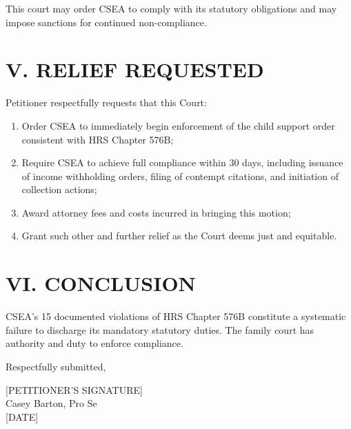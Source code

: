 \documentclass[12pt]{article}
\begin{document}
This court may order CSEA to comply with its statutory obligations and may impose sanctions for continued non-compliance.

\section*{V. RELIEF REQUESTED}

Petitioner respectfully requests that this Court:

\begin{enumerate}
\item Order CSEA to immediately begin enforcement of the child support order consistent with HRS Chapter 576B;
\item Require CSEA to achieve full compliance within 30 days, including issuance of income withholding orders, filing of contempt citations, and initiation of collection actions;
\item Award attorney fees and costs incurred in bringing this motion;
\item Grant such other and further relief as the Court deems just and equitable.
\end{enumerate}

\section*{VI. CONCLUSION}

CSEA's 15 documented violations of HRS Chapter 576B constitute a systematic failure to discharge its mandatory statutory duties. The family court has authority and duty to enforce compliance.

\vspace{0.3in}

Respectfully submitted,

\vspace{0.4in}

\noindent\hfill [PETITIONER'S SIGNATURE]\hfill\\
\noindent\hfill Casey Barton, Pro Se\hfill\\
\noindent\hfill [DATE]\hfill\\
\end{document}
